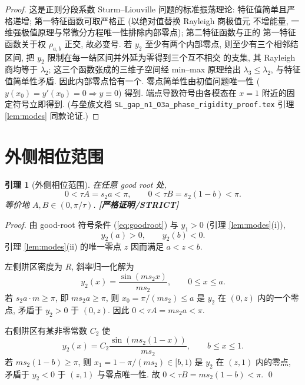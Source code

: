 \documentclass[UTF8]{ctexart}
\newtheorem{lemma}[theorem]{引理}
\newcommand{\STRICT}{\textbf{[严格证明/STRICT]}}
\begin{document}
\begin{proof}
	这是正则分段系数 Sturm--Liouville 问题的标准振荡理论:
	特征值简单且严格递增; 第一特征函数可取严格正 (以绝对值替换 Rayleigh 商极值元
	不增能量, 一维强极值原理与常微分方程唯一性排除内部零点); 第二特征函数与正的
	第一特征函数关于权 $\rho_{a,b}$ 正交, 故必变号. 若 $y_2$ 至少有两个内部零点,
	则至少有三个相邻结区间, 把 $y_2$ 限制在每一结区间并外延为零得到三个互不相交
	的支集, 其 Rayleigh 商均等于 $\lambda_2$; 这三个函数张成的三维子空间经 min--max
	原理给出 $\lambda_3\le\lambda_2$, 与特征值简单性矛盾. 因此内部零点恰有一个.
	零点简单性由初值问题唯一性 ($y(x_0)=y'(x_0)=0\Rightarrow y\equiv0$) 得到.
	端点导数符号由各模态在 $x=1$ 附近的固定符号立即得到.
	(与垒族文档 \texttt{SL\_gap\_n1\_O3a\_phase\_rigidity\_proof.tex} 引理
	\ref*{lem:modes} 同款论证.)
\end{proof}

\section{外侧相位范围}\label{sec:phases}

\begin{lemma}[外侧相位范围]\label{lem:phases}
	在任意 good root 处,
	\begin{equation}
		0<\tau A=s_2a<\pi,\qquad 0<\tau B=s_2(1-b)<\pi.
		\label{eq:phasesrange}
	\end{equation}
	等价地 $A,B\in(0,\pi/\tau)$. \STRICT{}
\end{lemma}

\begin{proof}
	由 good-root 符号条件 (\ref{eq:goodroot}) 与 $y_1>0$ (引理 \ref{lem:modes}(i)),
	\begin{equation}
		y_2(a)>0,\qquad y_2(b)<0.
	\end{equation}
	引理 \ref{lem:modes}(ii) 的唯一零点 $z$ 因而满足 $a<z<b$.

	左侧阱区密度为 $R$, 斜率归一化解为
	\begin{equation}
		y_2(x)=\frac{\sin(ms_2x)}{ms_2},\qquad 0\le x\le a.
	\end{equation}
	若 $s_2a\cdot m\ge\pi$, 即 $ms_2a\ge\pi$, 则 $x_0=\pi/(ms_2)\le a$ 是
	$y_2$ 在 $(0,z)$ 内的一个零点, 矛盾于 $y_2>0$ 于 $(0,z)$. 因此
	$0<\tau A=ms_2a<\pi$.

	右侧阱区有某非零常数 $C_2$ 使
	\begin{equation}
		y_2(x)=C_2\frac{\sin(ms_2(1-x))}{ms_2},\qquad b\le x\le1.
	\end{equation}
	若 $ms_2(1-b)\ge\pi$, 则 $x_1=1-\pi/(ms_2)\in[b,1)$ 是 $y_2$ 在 $(z,1)$
	内的零点, 矛盾于 $y_2<0$ 于 $(z,1)$ 与零点唯一性. 故
	$0<\tau B=ms_2(1-b)<\pi$. \qed
\end{proof}
\end{document}
